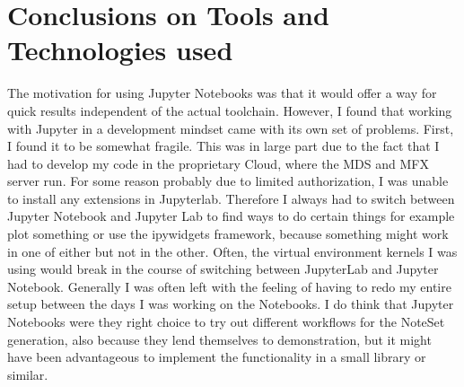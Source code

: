 \section{Conclusions on Tools and Technologies used}
The motivation for using Jupyter Notebooks was that it would offer a way for quick results independent of the actual toolchain. However, I found that working with Jupyter in a development mindset came with its own set of problems. First, I found it to be somewhat fragile. This was in large part due to the fact that I had to develop my code in the proprietary Cloud, where the MDS and MFX server run. For some reason probably due to limited authorization, I was unable to install any extensions in Jupyterlab. Therefore I always had to switch between Jupyter Notebook and Jupyter Lab to find ways to do certain things for example plot something or use the ipywidgets framework, because something might work in one of either but not in the other. Often, the virtual environment kernels I was using would break in the course of switching between JupyterLab and Jupyter Notebook. Generally I was often left with the feeling of having to redo my entire setup between the days I was working on the Notebooks. I do think that Jupyter Notebooks were they right choice to try out different workflows for the NoteSet generation, also because they lend themselves to demonstration, but it might have been advantageous to implement the functionality in a small library or similar.


